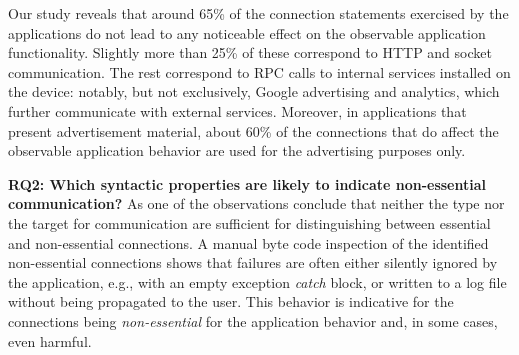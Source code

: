 Our study reveals that around 65\% of the connection statements exercised by the applications do not lead to any noticeable effect on the observable application functionality.
Slightly more than 25\% of these correspond to HTTP and socket communication. The rest correspond to RPC calls to internal services installed on the device: notably, but not exclusively, Google advertising and analytics, which further communicate with external services. 
Moreover, in applications that present advertisement material, about 60\% of the connections that do affect the observable application behavior are used for the advertising purposes only.

\vspace{0.1in}
\noindent 
{\bf RQ2: Which syntactic properties are likely to indicate non-essential communication?}
As one of the observations conclude that neither the type nor the target for communication are sufficient for distinguishing between essential and non-essential connections.
A manual byte code inspection of the identified non-essential connections shows that failures are often either silently ignored by the application, e.g., with an empty exception \emph{catch} block, or written to a log file without being propagated to the user. 
This behavior is indicative for the connections being \emph{non-essential} for the application behavior and, in some cases, even harmful. 
%
 





